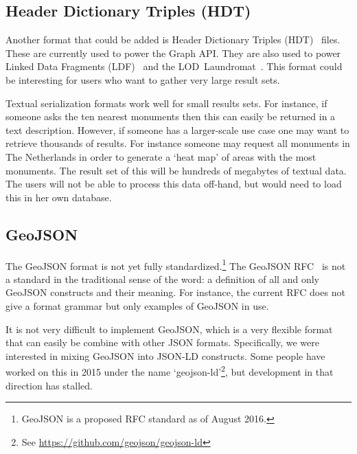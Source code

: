 \documentclass[a4paper]{scrartcl}
\begin{document}

\subsection{Header Dictionary Triples (HDT)}
\label{sec:hdt}

Another format that could be added is Header Dictionary Triples
(HDT)~\cite{Fernandez2013} files.  These are currently used to power
the Graph API.  They are also used to power Linked Data Fragments
(LDF)~\cite{Verborgh2014} and the LOD~Laundromat~\cite{Beek2014}.
This format could be interesting for users who want to gather very
large result sets.

Textual serialization formats work well for small results sets.  For
instance, if someone asks the ten nearest monuments then this can
easily be returned in a text description.  However, if someone has a
larger-scale use case one may want to retrieve thousands of results.
For instance someone may request all monuments in The Netherlands in
order to generate a `heat map' of areas with the most monuments.  The
result set of this will be hundreds of megabytes of textual data.  The
users will not be able to process this data off-hand, but would need
to load this in her own database.


\subsection{GeoJSON}
\label{sec:geojson}

The GeoJSON format is not yet fully standardized.\footnote{GeoJSON is
  a proposed RFC standard as of August 2016.}  The GeoJSON
RFC~\cite{Butler2016} is not a standard in the traditional sense of
the word: a definition of all and only GeoJSON constructs and their
meaning.  For instance, the current RFC does not give a format grammar
but only examples of GeoJSON in use.

It is not very difficult to implement GeoJSON, which is a very
flexible format that can easily be combine with other JSON formats.
Specifically, we were interested in mixing GeoJSON into JSON-LD
constructs.  Some people have worked on this in 2015 under the name
`geojson-ld'\footnote{See
  \url{https://github.com/geojson/geojson-ld}}, but development in
that direction has stalled.
\end{document}

